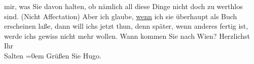 \begin{ledgroupsized}[t]{13cm}
               mir, was Sie davon halten, ob nämlich all diese Dinge nicht doch zu werthlos sind.
               (Nicht Affectation) Aber ich glaube, \uline{wenn} ich sie
               überhaupt als Buch erscheinen laße, dann will ichs jetzt thun, denn später, wenn
               anderes fertig ist, {\pb}werde ichs
               gewiss nicht mehr wollen. \pend
           \pstart
           Wann kommen Sie nach Wien? \pend
           \pstart
           Herzlichst {\\[\baselineskip]}Ihr {\\[\baselineskip]}\spacefill\mbox{Salten}\pend
           \leftskip=0em{}\pstart
           \noindent{}Grüßen Sie Hugo.\pend
           
         
         \endnumbering{}\end{ledgroupsized}\begin{anhang}\end{anhang}\newcommand{\dateiname}{L03299}\newcommand{\titel}{Felix Salten an Arthur Schnitzler, [29. 8. 1899]}\newcommand{\editorInnen}{Martin Anton Müller und Laura Untner}
      